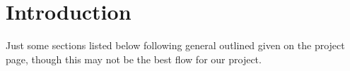 \section{Introduction} %
\label{sec:Introduction}

Just some sections listed below following general outlined given on the project
page, though this may not be the best flow for our project.
